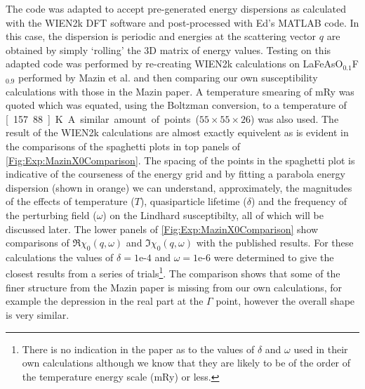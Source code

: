 The code was adapted to accept pre-generated energy dispersions as calculated with the WIEN2k DFT software and post-processed with Ed's MATLAB code. In this case, the dispersion is periodic and energies at the scattering vector $q$ are obtained by simply `rolling' the 3D matrix of energy values. Testing on this adapted code was performed by re-creating WIEN2k calculations on LaFeAsO$_{0.1}$F$_{0.9}$ performed by Mazin et al.\cite{Mazin2008} and then comparing our own susceptibility calculations with those in the Mazin paper. A temperature smearing of \unit[1]{mRy} was quoted which was equated, using the Boltzman conversion, to a temperature of \unit[157.88]{K}. A similar amount of points ($55\times55\times26$) was also used. The result of the WIEN2k calculations are almost exactly equivelent as is evident in the comparisons of the spaghetti plots in top panels of \fig\ref{Fig:Exp:MazinX0Comparison}. The spacing of the points in the spaghetti plot is indicative of the courseness of the energy grid and by fitting a parabola energy dispersion (shown in orange) we can understand, approximately, the magnitudes of the effects of temperature ($T$), quasiparticle lifetime ($\delta$) and the frequency of the perturbing field ($\omega$) on the Lindhard susceptibilty, all of which will be discussed later. The lower panels of \fig\ref{Fig:Exp:MazinX0Comparison} show comparisons of $\Re\chi_0(q,\omega)$ and $\Im\chi_0(q,\omega)$ with the published results. For these calculations the values of $\delta=\textrm{1e-4}$ and $\omega=\textrm{1e-6}$ were determined to give the closest results from a series of trials\footnote{There is no indication in the paper as to the values of $\delta$ and $\omega$ used in their own calculations although we know that they are likely to be of the order of the temperature energy scale (\unit[1]{mRy}) or less.}. The comparison shows that some of the finer structure from the Mazin paper is missing from our own calculations, for example the depression in the real part at the $\Gamma$ point, however the overall shape is very similar.

